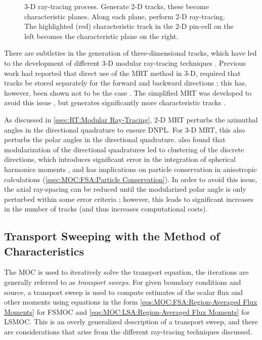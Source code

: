 {{{{        \begin{figure}[h]
          \centering
          \def\svgwidth{0.85\linewidth}
          
          \caption{3-D ray-tracing process. Generate 2-D tracks, these become characteristic planes. Along each plane, perform 2-D ray-tracing. The highlighted (red) characteristic track in the 2-D pin-cell on the left becomes the characteristic plane on the right.}
          \label{fig:RT:3-D Ray-tracing}
        \end{figure}

        There are subtleties in the generation of three-dimensional tracks, which have led to the development of different 3-D modular ray-tracing techniques \cite{Kochunas2013,Shaner2015}.
        Previous work had reported that direct use of the \ac{MRT} method in 3-D, required that tracks be stored separately for the forward and backward directions \cite{Kochunas2013};
        this has, however, been shown not to be the case \cite{Shaner2015}.
        The simplified \ac{MRT} was developed to avoid this issue \cite{Kochunas2013}, but generates significantly more characteristic tracks \cite{Shaner2015}.

        As discussed in \cref{ssec:RT:Modular Ray-Tracing}, 2-D \ac{MRT} perturbs the azimuthal angles in the directional quadrature to ensure \ac{DNPL}.
        For 3-D \ac{MRT}, this also perturbs the polar angles in the directional quadrature.
        \citet{Kochunas2013} also found that modularization of the directional quadratures led to clustering of the discrete directions, which introduces significant error in the integration of spherical harmonics moments \cite{Kochunas2013}, and has implications on particle conservation in anisotropic calculations (\cref{ssec:MOC:FSA:Particle Conservation}).
        In order to avoid this issue, the axial ray-spacing can be reduced until the modularized polar angle is only perturbed within some error criteria \cite{Kochunas2013}; however, this leads to significant increases in the number of tracks (and thus increases computational costs).
      }
    }

    \subsection{Transport Sweeping with the Method of Characteristics}{\label{ssec:RT:Transport Sweeping with the Method of Characteristics}
      The \ac{MOC} is used to iteratively solve the transport equation, the iterations are generally referred to as \emph{transport sweeps}.
      For given boundary conditions and source, a transport sweep is used to compute estimates of the scalar flux and other moments using equations in the form \cref{eqs:MOC:FSA:Region-Averaged Flux Moments} for \ac{FSMOC} and \cref{eqs:MOC:LSA:Region-Averaged Flux Moments} for \ac{LSMOC}.
      This is an overly generalized description of a transport sweep, and there are considerations that arise from the different ray-tracing techniques discussed.

}}}
